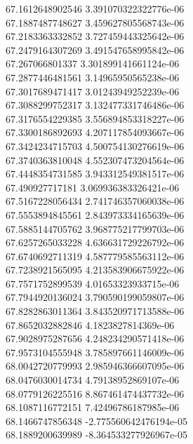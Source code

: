{67.1612648902546 3.391070322322776e-06 \\
67.1887487748627 3.459627805568743e-06 \\
67.2183363332852 3.727459443325642e-06 \\
67.2479164307269 3.491547658995842e-06 \\
67.267066801337 3.301899141661124e-06 \\
67.2877446481561 3.14965950565238e-06 \\
67.3017689471417 3.01243949252239e-06 \\
67.3088299752317 3.132477331746486e-06 \\
67.3176554229385 3.556894853318227e-06 \\
67.3300186892693 4.207117854093667e-06 \\
67.3424234715703 4.500754130276619e-06 \\
67.3740363810048 4.552307473204564e-06 \\
67.4448354731585 3.943312549381517e-06 \\
67.490927717181 3.069936383326421e-06 \\
67.5167228056434 2.741746357060038e-06 \\
67.5553894845561 2.843973334165639e-06 \\
67.5885144705762 3.968775217799703e-06 \\
67.6257265033228 4.636631729226792e-06 \\
67.6740692711319 4.587779585563112e-06 \\
67.7238921565095 4.213583906675922e-06 \\
67.7571752899539 4.01653323933715e-06 \\
67.7944920136024 3.790590199059807e-06 \\
67.8282863011364 3.843520971713588e-06 \\
67.8652032882846 4.1823827814369e-06 \\
67.9028975287656 4.248234290571418e-06 \\
67.9573104555948 3.785897661146009e-06 \\
68.0042720779993 2.985946366607095e-06 \\
68.0476030014734 4.79138952869107e-06 \\
68.0779126225516 8.867461474437732e-06 \\
68.1087116772151 7.42496786187985e-06 \\
68.1466747856348 -2.775560642476194e-05 \\
68.1889200639989 -8.364533277926967e-05 \\
}
